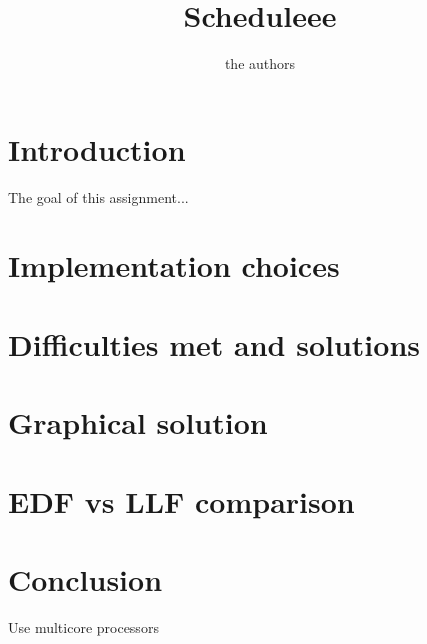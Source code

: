 \documentclass[12pt,a4paper]{article}
\title{Scheduleee}
\author{the authors}
\begin{document}
\maketitle
\thispagestyle{empty}
\tableofcontents
\newpage
\pagestyle{fancy}
\setcounter{page}{1}


\section{Introduction}

The goal of this assignment...

\section{Implementation choices}

\section{Difficulties met and solutions}

\section{Graphical solution}

\section{EDF vs LLF comparison}

\section{Conclusion}

Use multicore processors
\end{document}
